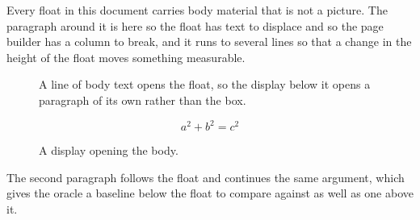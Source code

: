 \documentclass{article}
\begin{document}
Every float in this document carries body material that is not a
picture. The paragraph around it is here so the float has text to displace and
so the page builder has a column to break, and it runs to several lines so that
a change in the height of the float moves something measurable.

\begin{figure}[h]
\centering
A line of body text opens the float, so the display below it opens a
paragraph of its own rather than the box.

\[ a^2 + b^2 = c^2 \]
\caption{A display opening the body.}
\end{figure}

The second paragraph follows the float and continues the same
argument, which gives the oracle a baseline below the float to compare against
as well as one above it.
\end{document}

